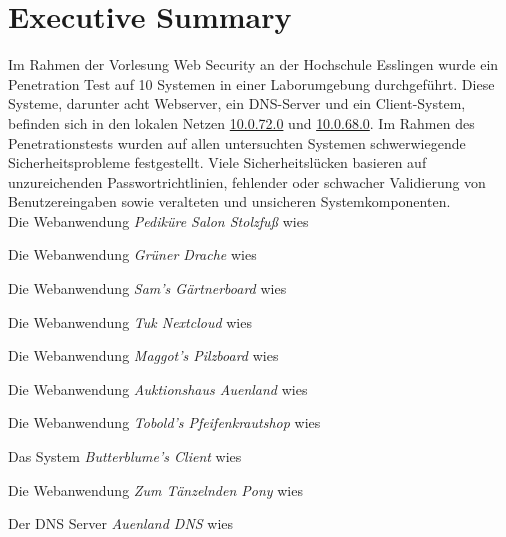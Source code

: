 \newpage
\chapter{Executive Summary}
Im Rahmen der Vorlesung Web Security an der Hochschule Esslingen wurde ein Penetration Test auf 10 Systemen in einer Laborumgebung durchgeführt. Diese Systeme, darunter acht Webserver, ein DNS-Server und ein Client-System, befinden sich in den lokalen Netzen \url{10.0.72.0} und \url{10.0.68.0}. Im Rahmen des Penetrationstests wurden auf allen untersuchten Systemen schwerwiegende Sicherheitsprobleme festgestellt. Viele Sicherheitslücken basieren auf unzureichenden Passwortrichtlinien, fehlender oder schwacher Validierung von Benutzereingaben sowie veralteten und unsicheren Systemkomponenten.\\

Die Webanwendung \textit{Pediküre Salon Stolzfuß} wies

Die Webanwendung \textit{Grüner Drache} wies

Die Webanwendung \textit{Sam's Gärtnerboard} wies

Die Webanwendung \textit{Tuk Nextcloud} wies

Die Webanwendung \textit{Maggot's Pilzboard} wies

Die Webanwendung \textit{Auktionshaus Auenland} wies

Die Webanwendung \textit{Tobold's Pfeifenkrautshop} wies

Das System \textit{Butterblume's Client} wies

Die Webanwendung \textit{Zum Tänzelnden Pony} wies

Der DNS Server \textit{Auenland DNS} wies